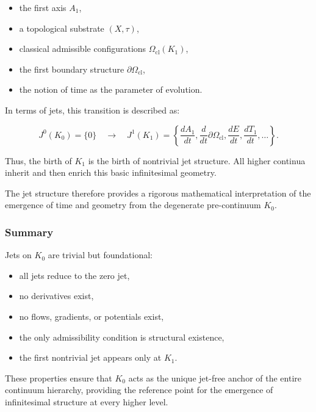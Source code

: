 \begin{itemize}
    \item the first axis $A_1$,
    \item a topological substrate $(X,\tau)$,
    \item classical admissible configurations $\Omega_{\mathrm{cl}}(K_1)$,
    \item the first boundary structure $\partial\Omega_{\mathrm{cl}}$,
    \item the notion of time as the parameter of evolution.
\end{itemize}

In terms of jets, this transition is described as:

\begin{equation}
J^0(K_0) = \{0\}
\quad \longrightarrow \quad
J^1(K_1) = 
\left\{
\frac{dA_1}{dt},
\frac{d}{dt}\partial\Omega_{\mathrm{cl}},
\frac{dE}{dt},
\frac{dT_1}{dt},
\ldots
\right\}.
\end{equation}

Thus, the birth of $K_1$ is the birth of nontrivial jet structure.  
All higher continua inherit and then enrich this basic infinitesimal
geometry.

The jet structure therefore provides a rigorous mathematical
interpretation of the emergence of time and geometry from the degenerate
pre-continuum $K_0$.



\subsubsection{Summary}

Jets on $K_0$ are trivial but foundational:

\begin{itemize}
    \item all jets reduce to the zero jet,
    \item no derivatives exist,
    \item no flows, gradients, or potentials exist,
    \item the only admissibility condition is structural existence,
    \item the first nontrivial jet appears only at $K_1$.
\end{itemize}

These properties ensure that $K_0$ acts as the unique jet-free anchor of
the entire continuum hierarchy, providing the reference point for the
emergence of infinitesimal structure at every higher level.
